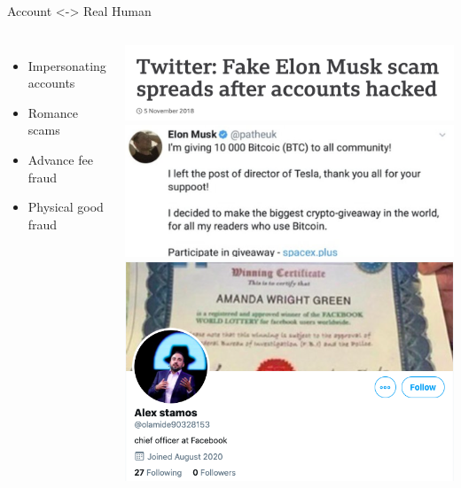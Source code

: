 \documentclass[nobackground,dvipsnames,table]{beamer}
\begin{document}
\begin{frame}{Account <-> Real Human}
    \begin{columns}
            \begin{itemize}
                \item Impersonating accounts
                \item Romance scams
                \item Advance fee fraud
                \item Physical good fraud
            \end{itemize}
            \vspace{0.05\textheight}
            \includegraphics[width=\textwidth]{musk-scam-headline}
            \includegraphics[width=\textwidth]{musk-scam-tweet}
            \includegraphics[width=\textwidth]{fake-stamos-twitter}
    \end{columns}
\end{frame}
\end{document}
